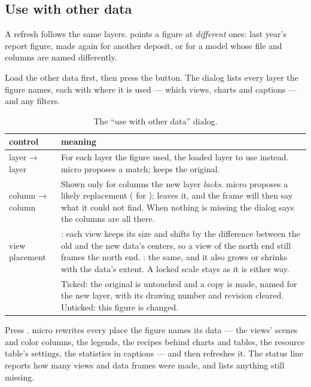 \subsection{Use with other data}\label{sec:compo-retarget}

A refresh follows the same layers.  points a figure at \emph{different} ones: last year's report figure, made again for another deposit, or for a model whose file and columns are named differently.

Load the other data first, then press the button. The dialog lists every layer the figure names, each with where it is used — which views, charts and captions — and any filters.

\begin{table}[htbp]\small
\begin{tabularx}{\linewidth}{@{}lL@{}}\toprule
control & meaning \\ \midrule
layer → layer & For each layer the figure used, the loaded layer to use instead. micro proposes a match;  keeps the original. \\
column → column & Shown only for columns the new layer \emph{lacks}. micro proposes a likely replacement ( for );  leaves it, and the frame will then say what it could not find. When nothing is missing the dialog says the columns are all there. \\
view placement & : each view keeps its size and shifts by the difference between the old and the new data's centers, so a view of the north end still frames the north end. : the same, and it also grows or shrinks with the data's extent. A locked scale stays as it is either way. \\
 & Ticked: the original is untouched and a copy is made, named for the new layer, with its drawing number and revision cleared. Unticked: this figure is changed. \\ \bottomrule
\end{tabularx}
\caption{The “use with other data” dialog.}\label{tab:compo-retarget}
\end{table}

Press . micro rewrites every place the figure names its data — the views' scenes and color columns, the legends, the recipes behind charts and tables, the resource table's settings, the statistics in captions — and then refreshes it. The status line reports how many views and data frames were made, and lists anything still missing.

